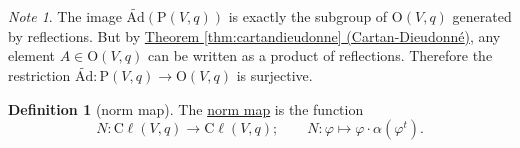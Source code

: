 \documentclass[a4paper,10pt]{scrreprt}
\newcommand{\defn}[1]{\ul{#1}}
\newcommand{\cliff}{\mathrm{C}\ell}
\newcommand{\tAd}{\widetilde{\mathrm{Ad}}}
\newcommand{\Or}{\mathrm{O}}
\theoremstyle{definition}
\newtheorem{definition}{Definition}[section]
\theoremstyle{plain}
\theoremstyle{remark}
\newtheorem{note}{Note}[section]
\begin{document}
\begin{note}
  \label{note:restrictionoftAdtopissurjective}
  The image $\tAd(\mathrm{P}(V, q))$ is exactly the subgroup of $\Or(V, q)$ generated by reflections. But by \hyperref[thm:cartandieudonne]{Theorem \ref*{thm:cartandieudonne} (Cartan-Dieudonn{\'e})}, any element $A \in \Or(V, q)$ can be written as a product of reflections. Therefore the restriction $\tAd\colon \mathrm{P}(V, q) \to \Or(V, q)$ is surjective.
\end{note} 

\begin{definition}[norm map]
  \label{def:normmap}
  The \defn{norm map} is the function 
  \begin{equation*}
    N\colon \cliff(V, q) \to \cliff(V, q);\qquad N\colon \varphi \mapsto \varphi \cdot \alpha(\varphi^{t}).
  \end{equation*}
\end{definition}
\end{document}
